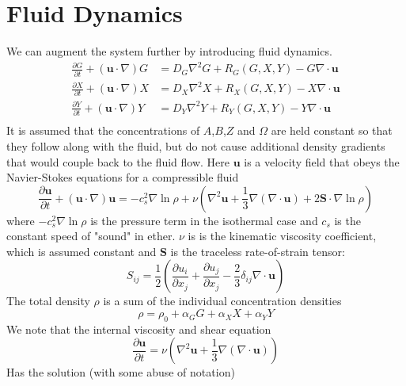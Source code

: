 \documentclass{article}
\begin{document}
\section{Fluid Dynamics}
We can augment the system further by introducing fluid dynamics.
\begin{align}
\frac{\partial G}{\partial t} + (\mathbf u \cdot \nabla) G &= D_G \nabla^2 G + R_G(G, X, Y) - G \nabla \cdot \mathbf u \label{eq:fluid_model_G}\\
\frac{\partial X}{\partial t} + (\mathbf u \cdot \nabla) X &= D_X \nabla^2 X + R_X(G, X, Y) - X \nabla \cdot \mathbf u \\
\frac{\partial Y}{\partial t} + (\mathbf u \cdot \nabla) Y &= D_Y \nabla^2 Y + R_Y(G, X, Y) - Y \nabla \cdot \mathbf u \\
\end{align}
It is assumed that the concentrations of $A$,$B$,$Z$ and $\Omega$ are held constant so that they follow along with the fluid, but do not cause additional density gradients that would couple back to the fluid flow.
Here $\mathbf u$ is a velocity field that obeys the Navier-Stokes equations for a compressible fluid
\begin{equation}
\frac{\partial \mathbf u}{\partial t} + (\mathbf u \cdot \nabla) \mathbf u = -c_s^2 \nabla \ln \rho + \nu \left (\nabla^2 \mathbf u + \frac{1}{3}\nabla(\nabla \cdot \mathbf u) + 2 \mathbf S \cdot \nabla \ln \rho \right ) \label{eq:navier-stokes}
\end{equation}
where $-c_s^2\nabla \ln \rho$ is the pressure term in the isothermal case and $c_s$ is the constant speed of "sound" in ether. $\nu$ is is the kinematic viscosity coefficient, which is assumed constant and $\mathbf S$ is the traceless rate-of-strain tensor:
\begin{equation}
S_{ij} = \frac{1}{2}\left ( \frac{\partial u_i}{\partial x_j} + \frac{\partial u_j}{\partial x_j} - \frac{2}{3}\delta_{ij}\nabla \cdot \mathbf u \right )
\end{equation}
The total density $\rho$ is a sum of the individual concentration densities
\begin{equation}
\rho = \rho_0 + \alpha_G G + \alpha_X X + \alpha_Y Y
\end{equation}
We note that the internal viscosity and shear equation
\begin{equation}
\frac{\partial \mathbf u}{\partial t} = \nu \left (\nabla^2 \mathbf u + \frac{1}{3}\nabla(\nabla \cdot \mathbf u) \right )
\end{equation}
Has the solution (with some abuse of notation)
\end{document}

